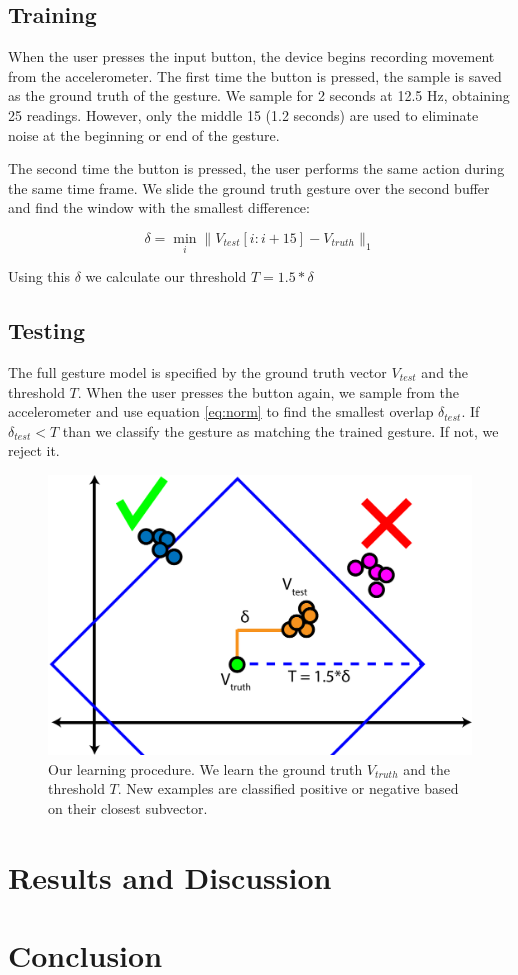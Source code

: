 \documentclass[12pt]{article}
\begin{document}
\subsection{Training}
When the user presses the input button, the device begins recording movement from the accelerometer. The first time the button is pressed, the sample is saved as the ground truth of the gesture. We sample for 2 seconds at 12.5 Hz, obtaining 25 readings. However, only the middle 15 (1.2 seconds) are used to eliminate noise at the beginning or end of the gesture.

The second time the button is pressed, the user performs the same action during the same time frame. We slide the ground truth gesture over the second buffer and find the window with the smallest difference:

\begin{equation}
\label{eq:norm}
\delta = \min_i \|V_{test}[i:i+15] - V_{truth} \|_1
\end{equation}

Using this $\delta$ we calculate our threshold $T = 1.5*\delta$

\subsection{Testing}
The full gesture model is specified by the ground truth vector $V_{test}$ and the threshold $T$. When the user presses the button again, we sample from the accelerometer and use equation \ref{eq:norm} to find the smallest overlap $\delta_{test}$. If $\delta_{test} < T$ than we classify the gesture as matching the trained gesture. If not, we reject it.

\begin{figure}[h]
\begin{center}
\includegraphics[width=.7\linewidth]{graph}
\end{center}
\caption{Our learning procedure. We learn the ground truth $V_{truth}$ and the threshold $T$. New examples are classified positive or negative based on their closest subvector.}
\label{graph}
\end{figure}


\section{Results and Discussion}

\section{Conclusion}



\end{document}
